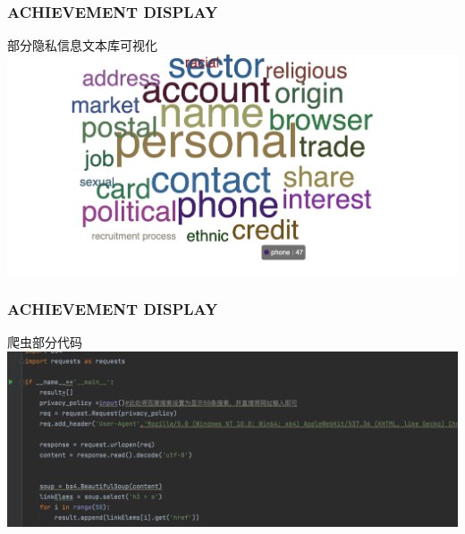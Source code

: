 \documentclass[10pt]{ctexbeamer}
\begin{document}
    \begin{frame}
        \frametitle{ACHIEVEMENT DISPLAY}
    
        \begin{block}{部分隐私信息文本库可视化}
            \includegraphics[scale=0.305]{dictionary.png}
        \end{block}
    \end{frame}

    \begin{frame}
        \frametitle{ACHIEVEMENT DISPLAY}
    
        \begin{block}{爬虫部分代码}
            \includegraphics[scale=0.305]{crawler.png}
        \end{block}
    \end{frame}
\end{document}
